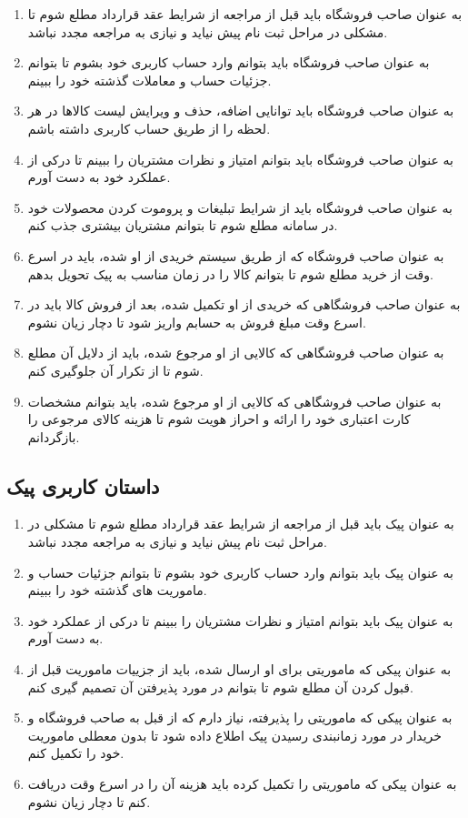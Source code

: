 \documentclass[12pt,a4paper]{article}
\begin{document}
\begin{enumerate}
	
\item
به عنوان صاحب فروشگاه باید قبل از مراجعه از شرایط عقد قرارداد مطلع شوم تا مشکلی در مراحل ثبت نام پیش نیاید و نیازی به مراجعه مجدد نباشد.
	\item
	به عنوان صاحب فروشگاه باید بتوانم وارد حساب کاربری خود بشوم تا بتوانم جزئیات حساب و معاملات گذشته خود را ببینم.
	\item
	به عنوان صاحب فروشگاه باید توانایی اضافه، حذف و ویرایش لیست کالاها در هر لحظه را از طریق حساب کاربری داشته باشم.
	\item
	به عنوان صاحب فروشگاه باید بتوانم امتیاز و نظرات مشتریان را ببینم تا درکی از عملکرد خود به دست آورم.
	\item
	به عنوان صاحب فروشگاه باید از شرایط تبلیغات و پروموت کردن محصولات خود در سامانه مطلع شوم تا بتوانم مشتریان بیشتری جذب کنم.
	\item
	به عنوان صاحب فروشگاه که از طریق سیستم خریدی از او شده، باید در اسرع وقت از خرید مطلع شوم تا بتوانم کالا را در زمان مناسب به پیک تحویل بدهم.
	\item
	به عنوان صاحب فروشگاهی که خریدی از او تکمیل شده، بعد از فروش کالا باید در اسرع وقت مبلغ فروش به حسابم واریز شود تا دچار زیان نشوم.
	\item
	به عنوان صاحب فروشگاهی که کالایی از او مرجوع شده، باید از دلایل آن مطلع شوم تا از تکرار آن جلوگیری کنم.
	\item
	به عنوان صاحب فروشگاهی که کالایی از او مرجوع شده، باید بتوانم مشخصات کارت اعتباری خود را ارائه و احراز هویت شوم تا هزینه کالای مرجوعی را بازگردانم.
\end{enumerate}

\subsection{\textbf{داستان کاربری پیک}}\label{section.userStory.delivery}

\begin{enumerate}
	\item 
به عنوان پیک باید قبل از مراجعه از شرایط عقد قرارداد مطلع شوم تا مشکلی در مراحل ثبت نام پیش نیاید و نیازی به مراجعه مجدد نباشد.
\item
به عنوان پیک باید بتوانم وارد حساب کاربری خود بشوم تا بتوانم جزئیات حساب و ماموریت های گذشته خود را ببینم.
\item
به عنوان پیک باید بتوانم امتیاز و نظرات مشتریان را ببینم تا درکی از عملکرد خود به دست آورم.
\item
به عنوان پیکی که ماموریتی برای او ارسال شده، باید از جزییات ماموریت قبل از قبول کردن آن مطلع شوم تا بتوانم در مورد پذیرفتن آن تصمیم گیری کنم.
\item
به عنوان پیکی که ماموریتی را پذیرفته، نیاز دارم که از قبل به صاحب فروشگاه و خریدار در مورد زمانبندی رسیدن پیک اطلاع داده شود تا بدون معطلی ماموریت خود را تکمیل کنم.
\item
به عنوان پیکی که ماموریتی را تکمیل کرده باید هزینه آن را در اسرع وقت دریافت کنم تا دچار زیان نشوم.
\end{enumerate}
\pagebreak
\end{document}
